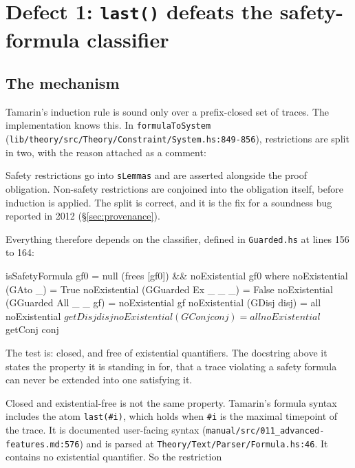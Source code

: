 \documentclass[version=preprint]{iacrcc}
\newcommand{\code}[1]{\texttt{\small #1}}
\theoremstyle{definition}
\theoremstyle{remark}
\begin{document}
\section{Defect 1: \texttt{last()} defeats the safety-formula classifier}\label{sec:last}

\subsection{The mechanism}

Tamarin's induction rule is sound only over a prefix-closed set of traces. The
implementation knows this. In \code{formulaToSystem}
(\code{lib/theory/src/Theory/Constraint/System.hs:849-856}), restrictions are
split in two, with the reason attached as a comment:


Safety restrictions go into \code{sLemmas} and are asserted alongside the proof
obligation. Non-safety restrictions are conjoined into the obligation itself,
before induction is applied. The split is correct, and it is the fix for a
soundness bug reported in 2012 (\S\ref{sec:provenance}).

Everything therefore depends on the classifier, defined in
\code{Guarded.hs} at lines 156 to 164:

\begin{hslisting}
	isSafetyFormula gf0 = null (frees [gf0]) && noExistential gf0
	where
	noExistential (GAto _)            = True
	noExistential (GGuarded Ex _ _ _) = False
	noExistential (GGuarded All _ _ gf) = noExistential gf
	noExistential (GDisj disj) = all noExistential $ getDisj disj
		noExistential (GConj conj) = all noExistential $ getConj conj
\end{hslisting}

The test is: closed, and free of existential quantifiers. The docstring above it
states the property it is standing in for, that a trace violating a safety
formula can never be extended into one satisfying it.

Closed and existential-free is not the same property. Tamarin's formula syntax
includes the atom \code{last(\#i)}, which holds when \code{\#i} is the maximal
timepoint of the trace. It is documented user-facing syntax
(\code{manual/src/011\_advanced-features.md:576}) and is parsed at
\code{Theory/Text/Parser/Formula.hs:46}. It contains no existential quantifier.
So the restriction
\end{document}
